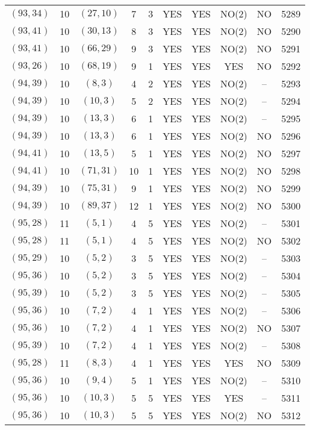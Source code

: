 \begin{longtable}{|c|c|c|c|c|c|c|c|c|c|}
$(93, 34)$ & 10 & $(27, 10)$ & 7 & 3 & YES & YES & NO(2) & NO & 5289\\
$(93, 41)$ & 10 & $(30, 13)$ & 8 & 3 & YES & YES & NO(2) & NO & 5290\\
$(93, 41)$ & 10 & $(66, 29)$ & 9 & 3 & YES & YES & NO(2) & NO & 5291\\
$(93, 26)$ & 10 & $(68, 19)$ & 9 & 1 & YES & YES & YES & NO & 5292\\
$(94, 39)$ & 10 & $(8, 3)$ & 4 & 2 & YES & YES & NO(2) & -- & 5293\\
$(94, 39)$ & 10 & $(10, 3)$ & 5 & 2 & YES & YES & NO(2) & -- & 5294\\
$(94, 39)$ & 10 & $(13, 3)$ & 6 & 1 & YES & YES & NO(2) & -- & 5295\\
$(94, 39)$ & 10 & $(13, 3)$ & 6 & 1 & YES & YES & NO(2) & NO & 5296\\
$(94, 41)$ & 10 & $(13, 5)$ & 5 & 1 & YES & YES & NO(2) & NO & 5297\\
$(94, 41)$ & 10 & $(71, 31)$ & 10 & 1 & YES & YES & NO(2) & NO & 5298\\
$(94, 39)$ & 10 & $(75, 31)$ & 9 & 1 & YES & YES & NO(2) & NO & 5299\\
$(94, 39)$ & 10 & $(89, 37)$ & 12 & 1 & YES & YES & NO(2) & NO & 5300\\
$(95, 28)$ & 11 & $(5, 1)$ & 4 & 5 & YES & YES & NO(2) & -- & 5301\\
$(95, 28)$ & 11 & $(5, 1)$ & 4 & 5 & YES & YES & NO(2) & NO & 5302\\
$(95, 29)$ & 10 & $(5, 2)$ & 3 & 5 & YES & YES & NO(2) & -- & 5303\\
$(95, 36)$ & 10 & $(5, 2)$ & 3 & 5 & YES & YES & NO(2) & -- & 5304\\
$(95, 39)$ & 10 & $(5, 2)$ & 3 & 5 & YES & YES & NO(2) & -- & 5305\\
$(95, 36)$ & 10 & $(7, 2)$ & 4 & 1 & YES & YES & NO(2) & -- & 5306\\
$(95, 36)$ & 10 & $(7, 2)$ & 4 & 1 & YES & YES & NO(2) & NO & 5307\\
$(95, 39)$ & 10 & $(7, 2)$ & 4 & 1 & YES & YES & NO(2) & -- & 5308\\
$(95, 28)$ & 11 & $(8, 3)$ & 4 & 1 & YES & YES & YES & NO & 5309\\
$(95, 36)$ & 10 & $(9, 4)$ & 5 & 1 & YES & YES & NO(2) & -- & 5310\\
$(95, 36)$ & 10 & $(10, 3)$ & 5 & 5 & YES & YES & YES & -- & 5311\\
$(95, 36)$ & 10 & $(10, 3)$ & 5 & 5 & YES & YES & NO(2) & NO & 5312\\

\end{longtable}

